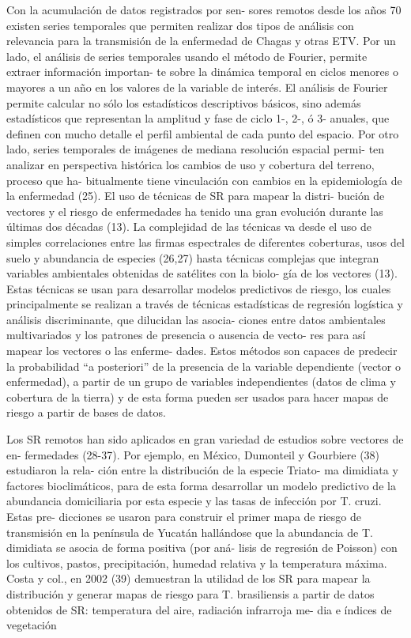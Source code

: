 Con la acumulación de datos registrados por sen-
sores remotos desde los años 70 existen series
temporales que permiten realizar dos tipos de
análisis con relevancia para la transmisión de la
enfermedad de Chagas y otras ETV. Por un lado,
el análisis de series temporales usando el método
de Fourier, permite extraer información importan-
te sobre la dinámica temporal en ciclos menores
o mayores a un año en los valores de la variable
de interés. El análisis de Fourier permite calcular
no sólo los estadísticos descriptivos básicos, sino
además estadísticos que representan la amplitud
y fase de ciclo 1-, 2-, ó 3- anuales, que definen con
mucho detalle el perfil ambiental de cada punto
del espacio. Por otro lado, series temporales de
imágenes de mediana resolución espacial permi-
ten analizar en perspectiva histórica los cambios
de uso y cobertura del terreno, proceso que ha-
bitualmente tiene vinculación con cambios en la
epidemiología de la enfermedad (25).
El uso de técnicas de SR para mapear la distri-
bución de vectores y el riesgo de enfermedades
ha tenido una gran evolución durante las últimas
dos décadas (13). La complejidad de las técnicas
va desde el uso de simples correlaciones entre
las firmas espectrales de diferentes coberturas,
usos del suelo y abundancia de especies (26,27)
hasta técnicas complejas que integran variables
ambientales obtenidas de satélites con la biolo-
gía de los vectores (13). Estas técnicas se usan
para desarrollar modelos predictivos de riesgo,
los cuales principalmente se realizan a través
de técnicas estadísticas de regresión logística y
análisis discriminante, que dilucidan las asocia-
ciones entre datos ambientales multivariados y
los patrones de presencia o ausencia de vecto-
res para así mapear los vectores o las enferme-
dades. Estos métodos son capaces de predecir
la probabilidad “a posteriori” de la presencia de
la variable dependiente (vector o enfermedad), a
partir de un grupo de variables independientes
(datos de clima y cobertura de la tierra) y de esta
forma pueden ser usados para hacer mapas de
riesgo a partir de bases de datos.

Los SR remotos han sido aplicados en gran
variedad de estudios sobre vectores de en-
fermedades (28-37). Por ejemplo, en México,
Dumonteil y Gourbiere (38) estudiaron la rela-
ción entre la distribución de la especie Triato-
ma dimidiata y factores bioclimáticos, para de
esta forma desarrollar un modelo predictivo de
la abundancia domiciliaria por esta especie y
las tasas de infección por T. cruzi. Estas pre-
dicciones se usaron para construir el primer
mapa de riesgo de transmisión en la península
de Yucatán hallándose que la abundancia de T.
dimidiata se asocia de forma positiva (por aná-
lisis de regresión de Poisson) con los cultivos,
pastos, precipitación, humedad relativa y la
temperatura máxima. Costa y col., en 2002 (39)
demuestran la utilidad de los SR para mapear
la distribución y generar mapas de riesgo para
T. brasiliensis a partir de datos obtenidos de SR:
temperatura del aire, radiación infrarroja me-
dia e índices de vegetación

